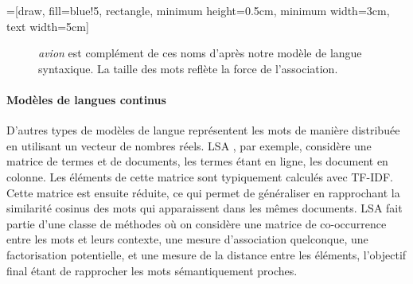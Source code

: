 =[draw, fill=blue!5, rectangle, minimum height=0.5cm, minimum width=3cm, text width=5cm]

\begin{figure}[ht]
  \centering
  \caption{\textit{avion} est complément de ces noms d'après notre modèle de
  langue syntaxique. La taille des mots reflète la force de l'association.}
\end{figure}

\paragraph{Modèles de langues continus} D'autres types de modèles de langue
représentent les mots de manière distribuée en utilisant un vecteur de nombres
réels. LSA \citep{deerwester1990indexing}, par exemple, considère une matrice
de termes et de documents, les termes étant en ligne, les document en colonne.
Les éléments de cette matrice sont typiquement calculés avec TF-IDF. Cette
matrice est ensuite réduite, ce qui permet de généraliser en rapprochant la
similarité cosinus des mots qui apparaissent dans les mêmes documents. LSA fait
partie d'une classe de méthodes où on considère une matrice de co-occurrence
entre les mots et leurs contexte, une mesure d'association quelconque, une
factorisation potentielle, et une mesure de la distance entre les éléments,
l'objectif final étant de rapprocher les mots sémantiquement proches.

